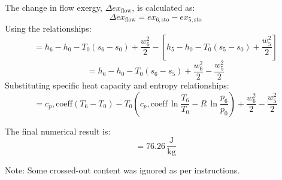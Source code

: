 The change in flow exergy, \( \Delta ex_{\text{flow}} \), is calculated as:  
\[
\Delta ex_{\text{flow}} = ex_{6,\text{sto}} - ex_{5,\text{sto}}
\]  
Using the relationships:  
\[
= h_6 - h_0 - T_0 \left( s_6 - s_0 \right) + \frac{w_6^2}{2} - \left[ h_5 - h_0 - T_0 \left( s_5 - s_0 \right) + \frac{w_5^2}{2} \right]
\]  
\[
= h_6 - h_0 - T_0 \left( s_6 - s_5 \right) + \frac{w_6^2}{2} - \frac{w_5^2}{2}
\]  
Substituting specific heat capacity and entropy relationships:  
\[
= c_p,\text{coeff} \left( T_6 - T_0 \right) - T_0 \left( c_p,\text{coeff} \, \ln \frac{T_6}{T_0} - R \, \ln \frac{p_6}{p_0} \right) + \frac{w_6^2}{2} - \frac{w_5^2}{2}
\]  

The final numerical result is:  
\[
= 76.26 \, \frac{\text{J}}{\text{kg}}
\]  

Note: Some crossed-out content was ignored as per instructions.